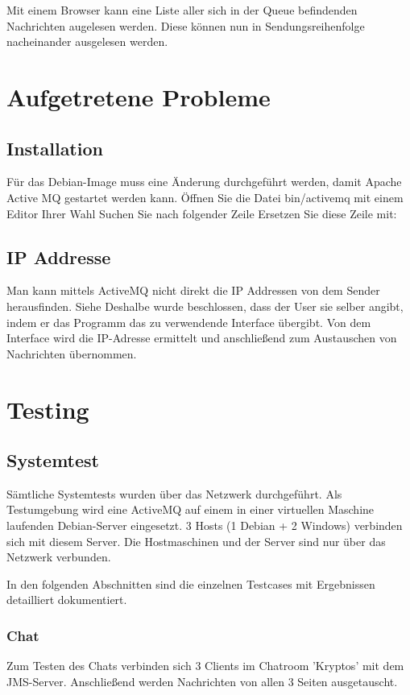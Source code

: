 \documentclass[11pt, a4paper]{article}
\begin{document}
Mit einem Browser kann eine Liste aller sich in der Queue befindenden Nachrichten augelesen werden. Diese können nun in Sendungsreihenfolge nacheinander
ausgelesen werden.

\newpage

\section{Aufgetretene Probleme}

\subsection{Installation}

Für das Debian-Image muss eine Änderung durchgeführt werden, damit Apache Active MQ gestartet werden kann.
Öffnen Sie die Datei bin/activemq mit einem Editor Ihrer Wahl 
Suchen Sie nach folgender Zeile
Ersetzen Sie diese Zeile mit:
\subsection{IP Addresse}
Man kann mittels ActiveMQ nicht direkt die IP Addressen von dem Sender herausfinden. Siehe 
Deshalbe wurde beschlossen, dass der User sie selber angibt, indem er das Programm das zu verwendende Interface übergibt. Von dem Interface wird die IP-Adresse ermittelt und anschließend zum Austauschen von Nachrichten übernommen.

\newpage

\section{Testing}

\subsection{Systemtest}
Sämtliche Systemtests wurden über das Netzwerk durchgeführt.
Als Testumgebung wird eine ActiveMQ auf einem in einer virtuellen Maschine laufenden Debian-Server eingesetzt. 3 Hosts (1 Debian + 2 Windows) verbinden sich
mit diesem Server. Die Hostmaschinen und der Server sind nur über das Netzwerk verbunden.

In den folgenden Abschnitten sind die einzelnen Testcases mit Ergebnissen detailliert dokumentiert.

\subsubsection{Chat}
Zum Testen des Chats verbinden sich 3 Clients im Chatroom 'Kryptos' mit dem JMS-Server.
Anschließend werden Nachrichten von allen 3 Seiten ausgetauscht.
\end{document}
